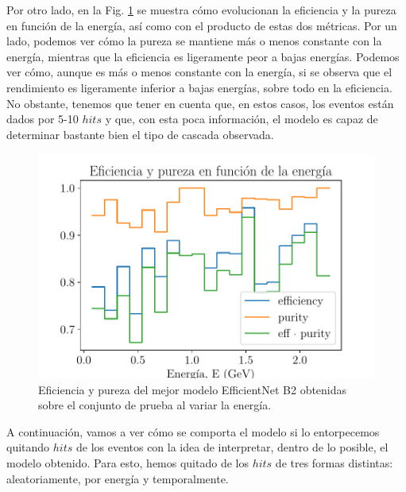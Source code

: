 \documentclass[a4paper,12pt,oneside,titlepage]{book}
\begin{document}
Por otro lado, en la Fig. \ref{fig:eff_pur} se muestra cómo evolucionan la eficiencia y la pureza en función de la energía, así como con el producto de estas dos métricas. Por un lado, podemos ver cómo la pureza se mantiene más o menos constante con la energía, mientras que la eficiencia es ligeramente peor a bajas energías. Podemos ver cómo, aunque es más o menos constante con la energía, si se observa que el rendimiento es ligeramente inferior a bajas energías, sobre todo en la eficiencia. No obstante, tenemos que tener en cuenta que, en estos casos, los eventos están dados por 5-10 $hits$ y que, con esta poca información, el modelo es capaz de determinar bastante bien el tipo de cascada observada.


\begin{figure}[h!]
  \centering
  \includegraphics[scale=0.55, center]{test.pdf}
  \caption{Eficiencia y pureza del mejor modelo EfficientNet B2 obtenidas sobre el conjunto de prueba al variar la energía.}
  \label{fig:eff_pur}
\end{figure}

A continuación, vamos a ver cómo se comporta el modelo si lo entorpecemos quitando $hits$ de los eventos con la idea de interpretar, dentro de lo posible, el modelo obtenido. Para esto, hemos quitado de los $hits$ de tres formas distintas: aleatoriamente, por energía y temporalmente.
 
\end{document}
